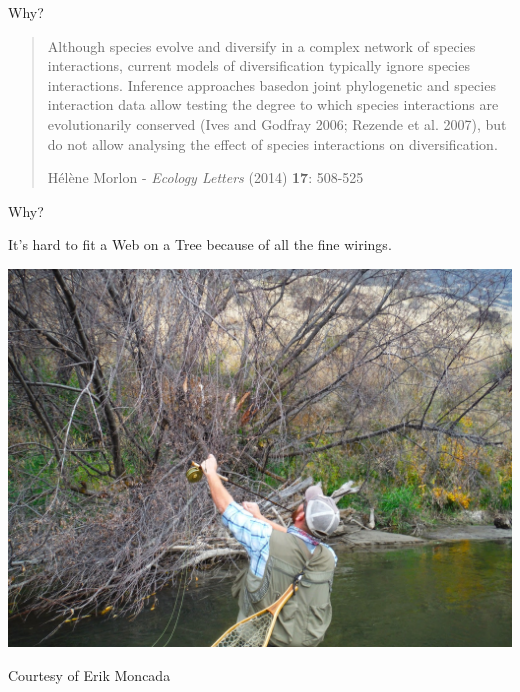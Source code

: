 \documentclass[]{beamer}
\begin{document}
\begin{frame}{Why?}


\begin{quote}
Although species evolve and diversify in a complex network of species interactions, current models of diversification typically ignore species interactions. Inference approaches basedon joint phylogenetic and species interaction data allow testing the degree to which species interactions are evolutionarily conserved (Ives and Godfray 2006; Rezende et al. 2007), but do not allow analysing the effect of species interactions on diversification.

\tiny{
H\'{e}l\`{e}ne Morlon - \textit{Ecology Letters} (2014) \textbf{17}: 508-525}
\end{quote}

\end{frame}

\begin{frame}{Why?}

\centering
It's hard to fit a Web on a Tree because of all the fine wirings.

\centering
\includegraphics[height=0.5 \textheight]{images/finewirings.jpg}

\centering
{\tiny Courtesy of Erik Moncada}

\end{frame}
\end{document}
